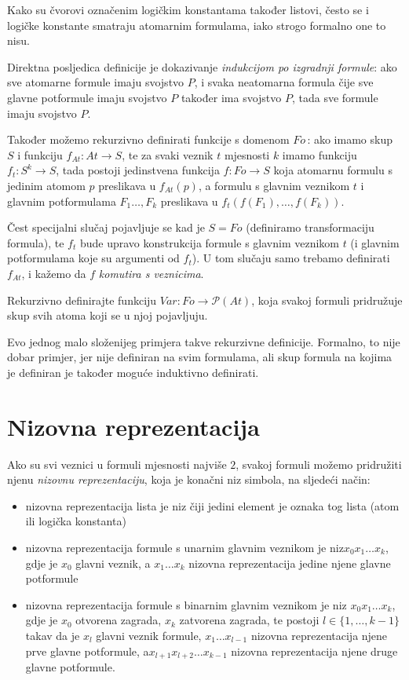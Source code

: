 Kako su čvorovi označenim logičkim konstantama također listovi, često se i logičke konstante smatraju atomarnim formulama, iako strogo formalno one to nisu.

Direktna posljedica definicije je dokazivanje \emph{indukcijom po izgradnji formule}: ako sve atomarne formule imaju svojstvo $P$, i svaka neatomarna formula čije sve glavne potformule imaju svojstvo $P$ također ima svojstvo $P$, tada sve formule imaju svojstvo $P$.

Također možemo rekurzivno definirati funkcije s domenom $Fo\,$: ako imamo skup $S$ i funkciju $f_{At}:At\to S$, te za svaki veznik $t$ mjesnosti $k$ imamo funkciju $f_t:S^k\to S$, tada postoji jedinstvena funkcija $f:Fo\to S$ koja atomarnu formulu s jedinim atomom $p$ preslikava u $f_{At}(p)$, a formulu s glavnim veznikom $t$ i glavnim potformulama $F_1\ldots,F_k$ preslikava u $f_t(f(F_1),\ldots,f(F_k))$.

Čest specijalni slučaj pojavljuje se kad je $S=Fo$ (definiramo transformaciju formula), te $f_t$ bude upravo konstrukcija formule s glavnim veznikom $t$ (i glavnim potformulama koje su argumenti od $f_t$). U tom slučaju samo trebamo definirati $f_{At}$, i kažemo da $f$ \emph{komutira s veznicima}.

\begin{zadatak}\label{zad:var}
Rekurzivno definirajte funkciju $Var:Fo\to\mathcal P(At)$, koja svakoj formuli pridružuje skup svih atoma koji se u njoj pojavljuju.
\end{zadatak}

Evo jednog malo složenijeg primjera takve rekurzivne definicije. Formalno, to nije dobar primjer, jer nije definiran na svim formulama, ali skup formula na kojima je definiran je također moguće induktivno definirati.

\section{Nizovna reprezentacija}

Ako su svi veznici u formuli mjesnosti najviše $2$, svakoj formuli možemo pridružiti njenu \emph{nizovnu reprezentaciju}, koja je konačni niz simbola, na sljedeći način:
\begin{itemize}
\item nizovna reprezentacija lista je niz čiji jedini element je oznaka tog lista (atom ili logička konstanta)
\item nizovna reprezentacija formule s unarnim glavnim veznikom je niz\newline $x_0x_1\ldots x_k$, gdje je $x_0$ glavni veznik, a $x_1\ldots x_k$ nizovna reprezentacija jedine njene glavne potformule
\item nizovna reprezentacija formule s binarnim glavnim veznikom je niz $x_0x_1\ldots x_k$, gdje je $x_0$ otvorena zagrada, $x_k$ zatvorena zagrada, te postoji $l\in\{1,\ldots,k-1\}$ takav da je $x_l$ glavni veznik formule, $x_1\ldots x_{l-1}$ nizovna reprezentacija njene prve glavne potformule, a\newline $x_{l+1}x_{l+2}\ldots x_{k-1}$ nizovna reprezentacija njene druge glavne potformule.
\end{itemize}

